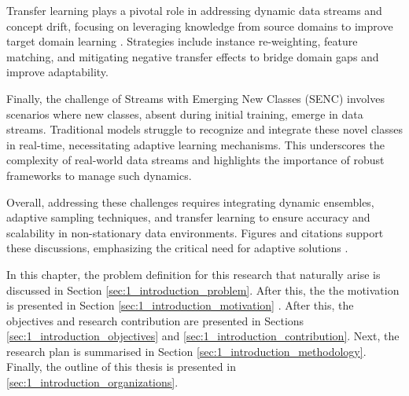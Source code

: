  Transfer learning  plays a pivotal role in addressing dynamic data streams and concept drift, focusing on leveraging knowledge from source domains to improve target domain learning \cite{pan2009survey, wang2018systematic}. Strategies include instance re-weighting, feature matching, and mitigating negative transfer effects to bridge domain gaps and improve adaptability.  

Finally, the challenge of  Streams with Emerging New Classes (SENC) involves scenarios where new classes, absent during initial training, emerge in data streams. Traditional models struggle to recognize and integrate these novel classes in real-time, necessitating adaptive learning mechanisms. This underscores the complexity of real-world data streams and highlights the importance of robust frameworks to manage such dynamics.  

Overall, addressing these challenges requires integrating dynamic ensembles, adaptive sampling techniques, and transfer learning to ensure accuracy and scalability in non-stationary data environments. Figures and citations support these discussions, emphasizing the critical need for adaptive solutions \cite{chawla2003smoteboost, wang2010negative}.
     
In this chapter, the problem definition for this research 
that naturally arise is discussed in  Section \ref{sec:1_introduction_problem}. After this, the the motivation is presented in Section \ref{sec:1_introduction_motivation} . After this, the objectives and
research contribution are presented in Sections \ref{sec:1_introduction_objectives} and \ref{sec:1_introduction_contribution}. Next, the research plan is summarised in Section \ref{sec:1_introduction_methodology}.  Finally, the outline of this thesis is presented in
\ref{sec:1_introduction_organizations}.